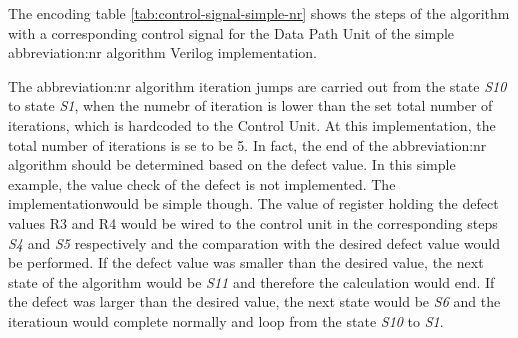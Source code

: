 \documentclass[a4paper, twoside, 11pt]{article}
\newcommand{\fbar}{\FloatBarrier}
\begin{document}
            The encoding table \ref{tab:control-signal-simple-nr} shows the steps of the algorithm with a corresponding control signal for the Data Path Unit of the simple \gls{abbreviation:nr} algorithm Verilog implementation.\par
            The \gls{abbreviation:nr} algorithm iteration jumps are carried out from the state \textit{S10} to state \textit{S1}, when the numebr of iteration is lower than the set total number of iterations, which is hardcoded to the Control Unit. At this implementation, the total number of iterations is se to be 5. In fact, the end of the \gls{abbreviation:nr} algorithm should be determined based on the defect value. In this simple example, the value check of the defect is not implemented. The implementationwould be simple though. The value of register holding the defect values R3 and R4 would be wired to the control unit in the corresponding steps \textit{S4} and \textit{S5} respectively and the comparation with the desired defect value would be performed. If the defect value was smaller than the desired value, the next state of the algorithm would be \textit{S11} and therefore the calculation would end. If the defect was larger than the desired value, the next state would be \textit{S6} and the iteratioun would complete normally and loop from the state \textit{S10} to \textit{S1}.

            

    \fbar
\end{document}
